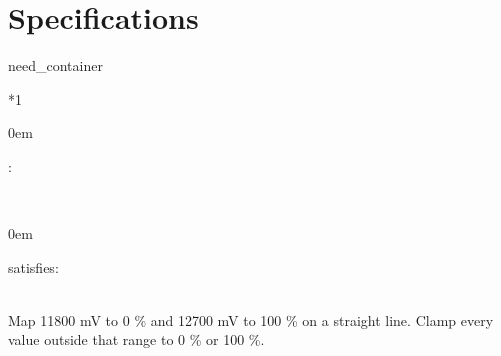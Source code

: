 \documentclass[a4paper,10pt,english]{sphinxmanual}
\begin{document}
\chapter{Specifications}
\label{\detokenize{requirements/specifications:specifications}}\label{\detokenize{requirements/specifications::doc}}
\begin{sphinxuseclass}{need_container}

\begin{savenotes}\sphinxattablestart
\sphinxthistablewithglobalstyle
\centering
{}\label{\detokenize{requirements/specifications:SPEC_SOC_LINEAR}}\nobreak
\begin{tabular}[t]{*{1}{}}
\sphinxtoprule
\sphinxtableatstartofbodyhook
\begin{DUlineblock}{0em}
\item[] :     
\end{DUlineblock}
\\
\sphinxhline
\begin{DUlineblock}{0em}
\item[] \item[] 
\item[] 

\item[] \item[] satisfies: 

\end{DUlineblock}
\\
\sphinxhline
\sphinxAtStartPar
Map 11800 mV to 0 \% and 12700 mV to 100 \% on a straight line.
Clamp every value outside that range to 0 \% or 100 \%.
\\
\sphinxbottomrule
\end{tabular}
\sphinxtableafterendhook\par
\sphinxattableend\end{savenotes}

\end{sphinxuseclass}
\end{document}
